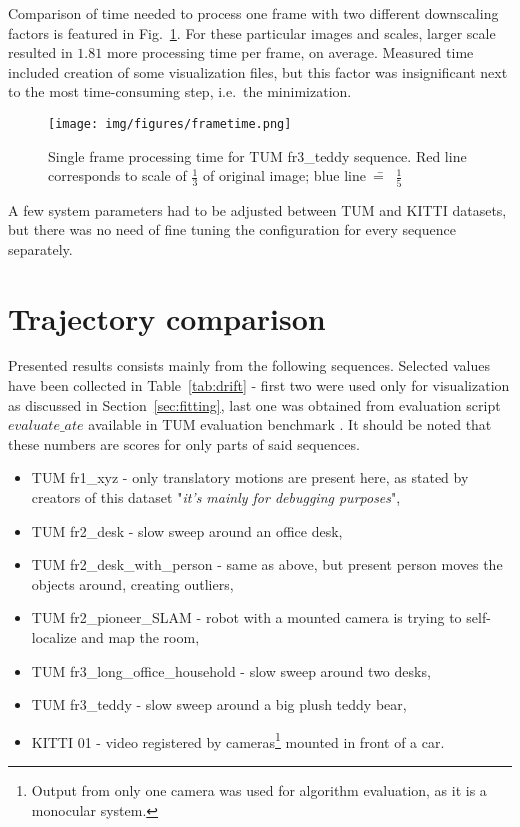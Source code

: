 Comparison of time needed to process one frame with two different downscaling factors is featured in Fig.~\ref{fig:timing}. For these particular images and scales, larger scale resulted in $1.81$ more processing time per frame, on average. Measured time included creation of some visualization files, but this factor was insignificant next to the most time-consuming step, i.e.~the minimization.

\begin{figure}[ht]
	\centering\texttt{[image: img/figures/frametime.png]}
	\caption{ Single frame processing time for TUM fr3\_teddy sequence. Red line corresponds to scale of $\frac{1}{3}$ of original image; blue line~\==~ $\frac{1}{5}$ }
	\label{fig:timing}
\end{figure}


A few system parameters had to be adjusted between TUM and KITTI datasets, but there was no need of fine tuning the configuration for every sequence separately.

\section{Trajectory comparison}

Presented results consists mainly from the following sequences. Selected values have been collected in Table~\ref{tab:drift} - first two were used only for visualization as discussed in Section~\ref{sec:fitting}, last one was obtained from evaluation script $evaluate\_ate$ available in TUM evaluation benchmark \cite{TUM}. It should be noted that these numbers are scores for only parts of said sequences.
\begin{itemize}
	\item TUM fr1\_xyz - only translatory motions are present here, as stated by creators of this dataset "\textit{it's mainly for debugging purposes}",
	\item TUM fr2\_desk - slow sweep around an office desk,
	\item TUM fr2\_desk\_with\_person - same as above, but present person moves the objects around, creating outliers,
	\item TUM fr2\_pioneer\_SLAM - robot with a mounted camera is trying to self-localize and map the room,
	\item TUM fr3\_long\_office\_household - slow sweep around two desks,
	\item TUM fr3\_teddy - slow sweep around a big plush teddy bear,
	\item KITTI 01 - video registered by cameras\footnote{Output from only one camera was used for algorithm evaluation, as it is a monocular system.} mounted in front of a car.
\end{itemize}

